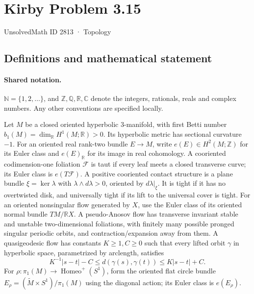 \documentclass[11pt]{article}
\begin{document}
\setcounter{section}{2812}
\section{Kirby Problem 3.15}\label{2813}
{\small\sffamily UnsolvedMath ID 2813 · Topology}
\subsection{Definitions and mathematical statement}

\paragraph{Shared notation.}$\mathbb N=\{1,2,\ldots\}$, and $\mathbb Z,\mathbb Q,\mathbb R,\mathbb C$ denote the integers, rationals, reals and complex numbers. Any other conventions are specified locally.


Let $M$ be a closed oriented hyperbolic $3$-manifold, with first Betti number $b_1(M)=\dim_{\mathbb R}H^1(M;\mathbb R)>0$. Its hyperbolic metric has sectional curvature $-1$. For an oriented real rank-two bundle $E\to M$, write $e(E)\in H^2(M;\mathbb Z)$ for its Euler class and $e(E)_{\mathbb R}$ for its image in real cohomology.
A cooriented codimension-one foliation $\mathcal F$ is taut if every leaf meets a closed transverse curve; its Euler class is $e(T\mathcal F)$. A positive cooriented contact structure is a plane bundle $\xi=\ker\lambda$ with $\lambda\wedge d\lambda>0$, oriented by $d\lambda|_\xi$. It is tight if it has no overtwisted disk, and universally tight if its lift to the universal cover is tight. For an oriented nonsingular flow generated by $X$, use the Euler class of its oriented normal bundle $TM/\mathbb RX$. A pseudo-Anosov flow has transverse invariant stable and unstable two-dimensional foliations, with finitely many possible pronged singular periodic orbits, and contraction/expansion away from them. A quasigeodesic flow has constants $K\ge1,C\ge0$ such that every lifted orbit $\gamma$ in hyperbolic space, parametrized by arclength, satisfies
\[
 K^{-1}|s-t|-C\le d(\gamma(s),\gamma(t))\le K|s-t|+C.
\]
For $\rho:\pi_1(M)\to\operatorname{Homeo}^+(S^1)$, form the oriented flat circle bundle $E_\rho=(\widetilde M\times S^1)/\pi_1(M)$ using the diagonal action; its Euler class is $e(E_\rho)$.
\end{document}
